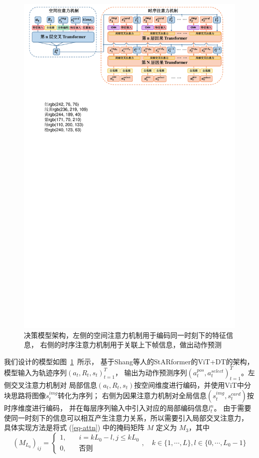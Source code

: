 \documentclass[openany,twoside,nofonts,AutoFakeBold,UTF8]{ctexbook}
\begin{document}
\begin{figure}[htbp]
  \centering\vspace{-2ex}
  \includegraphics[width=\textwidth]{policy_model.pdf}
  \caption{决策模型架构，左侧的空间注意力机制用于编码同一时刻下的特征信息，
  右侧的时序注意力机制用于关联上下帧信息，做出动作预测}
  \label{fig-model}
\end{figure}

我们设计的模型如图~\ref{fig-model}~所示，
基于Shang等人的\cite{StARformer}StARformer的ViT+DT的架构，
模型输入为轨迹序列$(a_t, R_t, s_t)_{t=1}^T$，
输出为动作预测序列$(a_t^{pos},a_t^{select})_{t=1}^T$。左侧交叉注意力机制对
局部信息$(a_t,R_t,s_t)$按空间维度进行编码，并使用ViT中分块思路将图像$s_t^{img}$转化为序列；
右侧为因果注意力机制对全局信息$(s^{img}_t,s^{card}_t)$按时序维度进行编码，
并在每层序列输入中引入对应的局部编码信息$l_t^{n}$。
由于需要使同一时刻下的信息可以相互产生注意力关系，所以需要引入局部交叉注意力，
具体实现方法是将式 (\ref{eq-attn}) 中的掩码矩阵 $M$ 定义为 $M_{3}$，其中
\begin{equation}
  (M_{L_0})_{ij} = \begin{cases}
    1, &\quad i=kL_0-l,j\leqslant kL_0\\
    0, &\quad \text{否则}
  \end{cases},\quad k\in\{1,\cdots,L\}, l\in\{0,\cdots,L_0-1\}
\end{equation}
\end{document}
